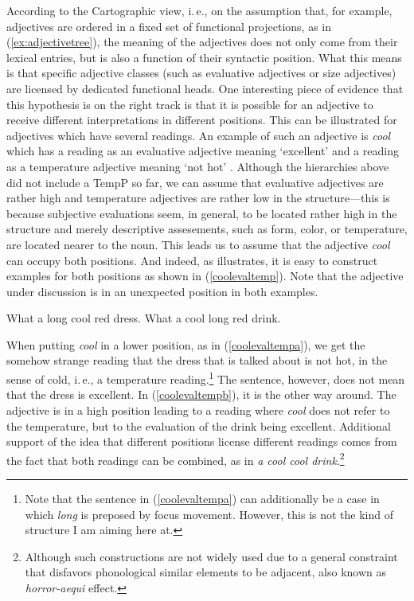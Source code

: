 \noindent According to the Cartographic view, i.\,e., on the assumption that, for example, adjectives are ordered in a fixed set of functional projections, as in (\ref{ex:adjectivetree}), the meaning of the adjectives does not only come from their lexical entries, but is also a function of their syntactic position. What this means is that specific adjective classes (such as evaluative adjectives or size adjectives) are licensed by dedicated functional heads. One interesting piece of evidence that this hypothesis is on the right track is that it is possible for an adjective to receive different interpretations in different positions. This can be illustrated for adjectives which have several readings. An example of such an adjective is \textit{cool} which has a reading as an evaluative adjective meaning `excellent' and a reading as a temperature adjective meaning `not hot' \citep{scott2002stacked}. Although the hierarchies above did not include a TempP so far, we can assume that evaluative adjectives are rather high and temperature adjectives are rather low in the structure---this is because subjective evaluations seem, in general, to be located rather high in the structure and merely descriptive assesements, such as form, color, or temperature, are located nearer to the noun. This leads us to assume that the adjective \textit{cool} can occupy both positions. And indeed, as \citep[106]{scott2002stacked} illustrates, it is easy to construct examples for both positions as shown in (\ref{coolevaltemp}). Note that the adjective under discussion is in an unexpected position in both examples. 

\begin{exe}
\ex\label{coolevaltemp}\begin{xlist} 
\ex What a long cool red dress. \label{coolevaltempa}
\ex What a cool long red drink. \label{coolevaltempb}
\end{xlist}
\end{exe}

\noindent When putting \textit{cool} in a lower position, as in (\ref{coolevaltempa}), we get the somehow strange reading that the dress that is talked about is not hot, in the sense of cold, i.\,e., a temperature reading.\footnote{ Note that the sentence in (\ref{coolevaltempa}) can additionally be a case in which \textit{long} is preposed by focus movement. However, this is not the kind of structure I am aiming here at.} The sentence, however, does not mean that the dress is excellent. In (\ref{coolevaltempb}), it is the other way around. The adjective is in a high position leading to a reading where \textit{cool} does not refer to the temperature, but to the evaluation of the drink being excellent. Additional support of the idea that different positions license different readings comes from the fact that both readings can be combined, as in \textit{a cool cool drink}.\footnote{ Although such constructions are not widely used due to a general constraint that disfavors phonological similar elements to be adjacent, also known as \textit{horror-aequi} effect.}

